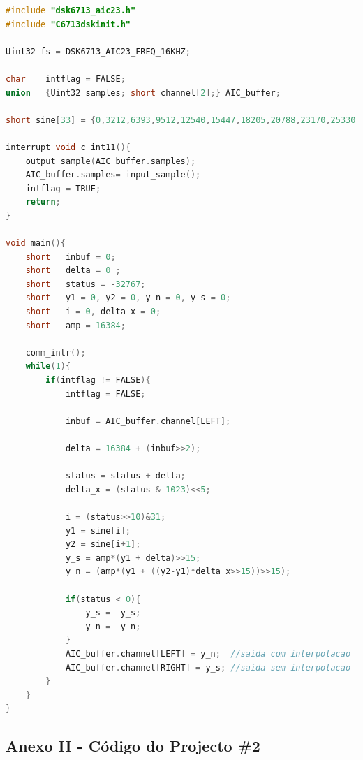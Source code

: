 \documentclass[11pt]{article}
\numberwithin{equation}{section}
\begin{document}
\begin{lstlisting}[language=C]
#include "dsk6713_aic23.h"
#include "C6713dskinit.h"

Uint32 fs = DSK6713_AIC23_FREQ_16KHZ;

char	intflag = FALSE;
union	{Uint32 samples; short channel[2];} AIC_buffer;

short sine[33] = {0,3212,6393,9512,12540,15447,18205,20788,23170,25330,27246,28899,30274,31357,		32138,32610,32767,32610,32138,31357,30274,28899,27246,25330,23170,20788,18205,	15447,12540,9512,6393,3212,0}; 

interrupt void c_int11(){                  	
	output_sample(AIC_buffer.samples); 
	AIC_buffer.samples= input_sample(); 
	intflag = TRUE;
	return;
}

void main(){
	short	inbuf = 0;
	short	delta = 0 ;
	short	status = -32767;
	short	y1 = 0, y2 = 0, y_n = 0, y_s = 0;
	short	i = 0, delta_x = 0;
	short	amp = 16384;
	
	comm_intr();
	while(1){
		if(intflag != FALSE){
			intflag = FALSE;
				
			inbuf = AIC_buffer.channel[LEFT];
			
			delta = 16384 + (inbuf>>2);
			
			status = status + delta;
			delta_x = (status & 1023)<<5;
			
			i = (status>>10)&31;
			y1 = sine[i];
			y2 = sine[i+1];
			y_s = amp*(y1 + delta)>>15;  
			y_n = (amp*(y1 + ((y2-y1)*delta_x>>15))>>15);
			
			if(status < 0){
				y_s = -y_s;
				y_n = -y_n;
			}
			AIC_buffer.channel[LEFT] = y_n;  //saida com interpolacao
			AIC_buffer.channel[RIGHT] = y_s; //saida sem interpolacao
		}
	}
}
\end{lstlisting}

\subsection{Anexo II - Código do Projecto \#2}
\end{document}
